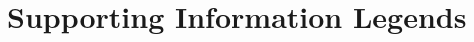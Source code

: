 \documentclass[10pt,letterpaper]{article}
\begin{document}
\section*{Supporting Information Legends}
%
% 

\end{document}
